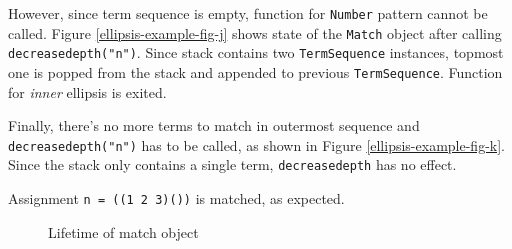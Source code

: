However, since term sequence is empty, function for \texttt{Number} pattern cannot be called. Figure \ref{ellipsis-example-fig-j} shows state of the \texttt{Match} object after calling \texttt{decreasedepth("n")}. Since stack contains two \texttt{TermSequence} instances, topmost one is popped from the stack and appended to previous \texttt{TermSequence}. Function for \textit{inner} ellipsis is exited.

Finally, there's no more terms to match in outermost sequence and \texttt{decreasedepth("n")} has to be called, as shown in Figure \ref{ellipsis-example-fig-k}. Since the stack only contains a single term, \texttt{decreasedepth} has no effect.

Assignment \texttt{n = ((1 2 3)())} is matched, as expected.


\begin{figure}[H]
\caption{Lifetime of match object}


\end{figure}

